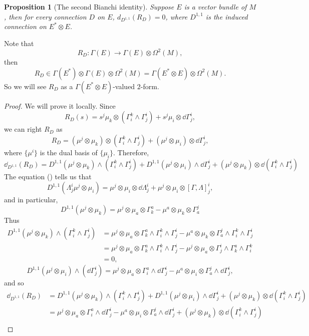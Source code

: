 \documentclass[11pt]{article}
\theoremstyle{definition}
\theoremstyle{plain}
\newtheorem{pro}[para]{Proposition}
\begin{document}
\begin{pro}[The second Bianchi identity]
Suppose $E$ is a vector bundle of $M$, then for every connection $D$ on $E$, $d_{D^{1,1}}(R_D)=0$, where $D^{1,1}$ is the induced connection on $E^*\otimes E$.
\end{pro}

Note that
\[
	R_D:\Gamma(E)\to \Gamma(E)\otimes\Omega^2(M),
\]
then
\[
	R_D\in \Gamma(E^*)\otimes \Gamma(E)\otimes\Omega^2(M)=\Gamma(E^*\otimes E)\otimes\Omega^2(M).
\]
So we will see $R_D$ as a $\Gamma(E^*\otimes E)$-valued $2$-form.

\begin{proof}
We will prove it locally. Since
\[
	R_D(s)=s^j\mu_k\otimes (\Gamma^k_i\wedge \Gamma^i_j)+s^j\mu_i\otimes \dd \Gamma^i_j,
\]
we can right $R_D$ as
\[
	R_D=(\mu^j\otimes \mu_k)\otimes (\Gamma^k_i\wedge \Gamma^i_j)+(\mu^j\otimes\mu_i)\otimes \dd \Gamma^i_j,
\]
where $\{\mu^i\}$ is the dual basis of $\{\mu_i\}$. Therefore,
\[
	\dd_{D^{1,1}}(R_D)=D^{1,1}(\mu^j\otimes \mu_k)\wedge (\Gamma^k_i\wedge \Gamma^i_j)+D^{1,1}(\mu^j\otimes\mu_i)\wedge \dd \Gamma^i_j+(\mu^j\otimes \mu_k)\otimes \dd(\Gamma^k_i\wedge \Gamma^i_j)
\]
The equation (\theequation) tells us that
\[
	D^{1,1}(\Lambda^i_j\mu^j\otimes \mu_i)=\mu^j\otimes \mu_i\otimes\dd\Lambda^i_j+\mu^j\otimes \mu_i\otimes [\Gamma,\Lambda]^i_j,
\]
and in particular,
\[
	D^{1,1}(\mu^j\otimes \mu_k)=\mu^j\otimes \mu_a\otimes \Gamma^a_k-\mu^a\otimes \mu_k\otimes\Gamma^j_a
\]
Thus
\begin{align*}
	D^{1,1}(\mu^j\otimes \mu_k)\wedge (\Gamma^k_i\wedge \Gamma^i_j)&=\mu^j\otimes \mu_a\otimes \Gamma^a_k\wedge \Gamma^k_i\wedge \Gamma^i_j-\mu^a\otimes \mu_k\otimes\Gamma^j_a\wedge\Gamma^k_i\wedge \Gamma^i_j\\
	&=\mu^j\otimes \mu_a\otimes \Gamma^a_k\wedge \Gamma^k_i\wedge \Gamma^i_j-\mu^j\otimes \mu_a\otimes\Gamma^i_j\wedge\Gamma^a_k\wedge \Gamma^k_i\\
	&=0,
\end{align*}
\[
	D^{1,1}(\mu^j\otimes \mu_i)\wedge (\dd \Gamma^i_j)=\mu^j\otimes \mu_a\otimes \Gamma^a_i\wedge \dd \Gamma^i_j-\mu^a\otimes \mu_i\otimes\Gamma^j_a\wedge\dd \Gamma^i_j,
\]
and so
\begin{align*}
\dd_{D^{1,1}}(R_D)&=D^{1,1}(\mu^j\otimes \mu_k)\wedge (\Gamma^k_i\wedge \Gamma^i_j)+D^{1,1}(\mu^j\otimes\mu_i)\wedge \dd \Gamma^i_j+(\mu^j\otimes \mu_k)\otimes \dd(\Gamma^k_i\wedge \Gamma^i_j)\\
&=\mu^j\otimes \mu_a\otimes \Gamma^a_i\wedge \dd \Gamma^i_j-\mu^a\otimes \mu_i\otimes\Gamma^j_a\wedge\dd \Gamma^i_j+(\mu^j\otimes \mu_k)\otimes \dd(\Gamma^k_i\wedge \Gamma^i_j)\\

\end{align*}
\end{proof}
\end{document}
